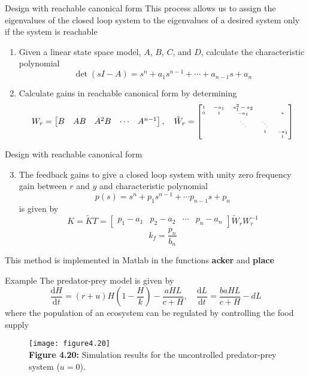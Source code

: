 \documentclass{beamer-control}
\begin{document}
\begin{frame}{Design with reachable canonical form}
This process allows us to assign the eigenvalues of the closed loop system to the eigenvalues of a desired system only if the system is reachable
\begin{enumerate}
	\item Given a linear state space model, $A$, $B$, $C$, and $D$, calculate the characteristic polynomial
	\[\operatorname{det}(sI-A) = s^n+a_1s^{n-1}+\cdots + a_{n-1}s+a_n\]
	\item Calculate gains in reachable canonical form  
	by determining  \[W_r = \begin{bmatrix}
		B & AB & A^2 B & \cdots & A^{n-1}
	\end{bmatrix},\quad \tiny{\tilde{W}_r = \begin{bmatrix}
		1 & -a_1 & a_1^2-a_2 & & \\
		0 & 1 & -a_1 & & * \\
		& & \ddots & \ddots & \\
		&  & & 1 & -a_1 \\
		& & & & 1
	\end{bmatrix}}\]
\end{enumerate}
\end{frame}

\begin{frame}{Design with reachable canonical form}
\begin{enumerate}
	\setcounter{enumi}{2}
	\item The feedback gains to give a closed loop system with unity zero frequency gain between $r$ and $y$ and characteristic polynomial
	\[p(s) = s^n+p_1 s^{n-1}+ \cdots p_{n-1}s+p_n\]
	is given by 
	\[K=\tilde{K}T = \begin{bmatrix}
		p_1-a_1 & p_2-a_2 & \cdots & p_n-a_n
	\end{bmatrix} \tilde{W}_r W_r^{-1}\]
	\[k_f = \frac{p_n}{b_n}\]
\end{enumerate}
This method is implemented in Matlab in the functions \textbf{acker} and \textbf{place}
\end{frame}

\begin{frame}{Example}
The predator-prey model is given by 
\[\frac{\mathrm{d}H}{\mathrm{d}t} = (r+u)H\left(1-\frac{H}{k} \right)-\frac{aHL}{c+H}, \quad \frac{\mathrm{d}L}{\mathrm{d}t} = \frac{baHL}{c+H}-dL\]
where the population of an ecosystem can be regulated by controlling the food supply

\begin{figure}
	\centering
	\texttt{[image: figure4.20]}
	\\
	\textbf{Figure 4.20:} Simulation results for the uncontrolled predator-prey system ($u=0$).
\end{figure}

\end{frame}
\end{document}
